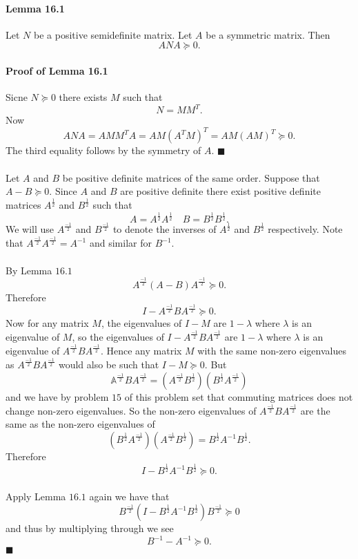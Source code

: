 \documentclass[letterpaper,12pt,oneside,onecolumn]{article}
\newcommand{\A}{\mathbb{A}} \newcommand{\C}{\mathbb{C}}
\newcommand{\1}{\mathbbm{1}}
\begin{document}
\paragraph{Lemma 16.1}
Let $N$ be a positive semidefinite matrix. Let $A$ be a symmetric matrix. Then
$$ANA \succcurlyeq 0.$$
\paragraph{Proof of Lemma 16.1}
Sicne $N \succcurlyeq 0$ there exists $M$ such that
$$N = MM^T.$$
Now $$ANA = AMM^TA = AM(A^TM)^T = AM(AM)^T \succcurlyeq 0.$$ 
The third equality follows by the symmetry of $A$. $\blacksquare$
\paragraph{}
Let $A$ and $B$ be positive definite matrices of the same order. Suppose that $A - B \succcurlyeq 0$. Since $A$ and $B$ are positive definite there exist positive definite matrices $A^\frac{1}{2}$ and $B^\frac{1}{2}$ such that
$$ A= A^\frac{1}{2}A^\frac{1}{2} \quad B = B^\frac{1}{2} B^\frac{1}{2}.$$
We will use $A^\frac{-1}{2}$ and $B^\frac{-1}{2}$ to denote the inverses of $A^\frac{1}{2}$ and $B^\frac{1}{2}$ respectively. Note that $A^\frac{-1}{2}A^\frac{-1}{2} = A^{-1}$ and similar for $B^{-1}$.
\paragraph{}
By Lemma $16.1$
$$A^\frac{-1}{2}(A-B)A^\frac{-1}{2} \succcurlyeq 0.$$
Therefore
$$I - A^\frac{-1}{2}BA^\frac{-1}{2} \succcurlyeq 0.$$
Now for any matrix $M$, the eigenvalues of $I-M$ are $1-\lambda$ where $\lambda$ is an eigenvalue of $M$, so the eigenvalues of $I - A^\frac{-1}{2}BA^\frac{-1}{2}$ are $1- \lambda$ where $\lambda$ is an eigenvalue of $A^\frac{-1}{2}BA^\frac{-1}{2}$. Hence any matrix $M$ with the same non-zero eigenvalues as $A^\frac{-1}{2}BA^\frac{-1}{2}$ would also be such that $I - M \succcurlyeq 0$. But $$\A^\frac{-1}{2}BA^\frac{-1}{2}  = (A^\frac{-1}{2}B^\frac{1}{2})(B^\frac{1}{2}A^\frac{-1}{2})$$
and we have by problem $15$ of this problem set that commuting matrices does not change non-zero eigenvalues. So the non-zero eigenvalues of $A^\frac{-1}{2}BA^\frac{-1}{2}$ are the same as the non-zero eigenvalues of $$(B^\frac{1}{2}A^\frac{-1}{2})(A^\frac{-1}{2}B^\frac{1}{2}) = B^\frac{1}{2}A^{-1}B^\frac{1}{2}.$$
Therefore
$$I - B^\frac{1}{2}A^{-1}B^\frac{1}{2} \succcurlyeq 0.$$
\paragraph{}
Apply Lemma $16.1$ again we have that
$$B^\frac{-1}{2}(I - B^\frac{1}{2}A^{-1}B^\frac{1}{2})B^\frac{-1}{2} \succcurlyeq 0$$
and thus by multiplying through we see
$$B^{-1} - A^{-1} \succcurlyeq 0.$$
$\blacksquare$
\end{document}

